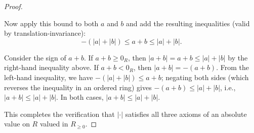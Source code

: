 \begin{proof}
\begin{enumerate}
        Now apply this bound to both $a$ and $b$ and add the resulting inequalities (valid by translation-invariance):
        $$-(|a| + |b|) \leq a + b \leq |a| + |b|.$$

        Consider the sign of $a+b$. If $a+b \geq 0_R$, then $|a+b| = a+b \leq |a| + |b|$ by the right-hand inequality above. If $a+b < 0_R$, then $|a+b| = -(a+b)$. From the left-hand inequality, we have $-(|a| + |b|) \leq a + b$; negating both sides (which reverses the inequality in an ordered ring) gives $-(a+b) \leq |a| + |b|$, i.e., $|a+b| \leq |a| + |b|$. In both cases, $|a+b| \leq |a| + |b|$.
    \end{enumerate}

    This completes the verification that $|\cdot|$ satisfies all three axioms of an absolute value on $R$ valued in $R_{\geq 0}$.
\end{proof}